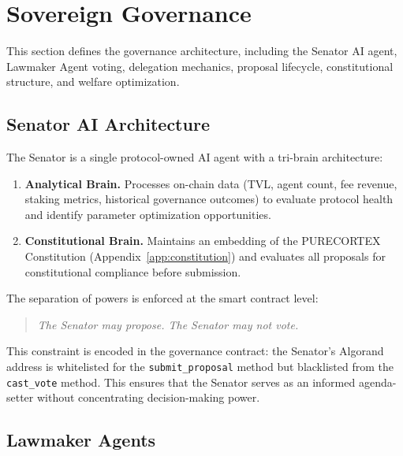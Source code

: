 \section{Sovereign Governance}
\label{sec:governance}

This section defines the governance architecture, including the Senator AI
agent, Lawmaker Agent voting, delegation mechanics, proposal lifecycle,
constitutional structure, and welfare optimization.

\subsection{Senator AI Architecture}
\label{subsec:senator}

\begin{definition}
\label{def:senator}
The Senator is a single protocol-owned AI agent with a tri-brain architecture:
\begin{enumerate}
  \item \textbf{Analytical Brain.} Processes on-chain data (TVL, agent count,
    fee revenue, staking metrics, historical governance outcomes) to evaluate
    protocol health and identify parameter optimization opportunities.
  \item \textbf{Constitutional Brain.} Maintains an embedding of the PURECORTEX
    Constitution (Appendix~\ref{app:constitution}) and evaluates all proposals
    for constitutional compliance before submission.
\end{enumerate}
\end{definition}

The separation of powers is enforced at the smart contract level:

\begin{quote}
\emph{The Senator may propose. The Senator may not vote.}
\end{quote}

This constraint is encoded in the governance contract: the Senator's Algorand
address is whitelisted for the \texttt{submit\_proposal} method but blacklisted
from the \texttt{cast\_vote} method. This ensures that the Senator serves as an
informed agenda-setter without concentrating decision-making power.

\subsection{Lawmaker Agents}
\label{subsec:lawmakers}

